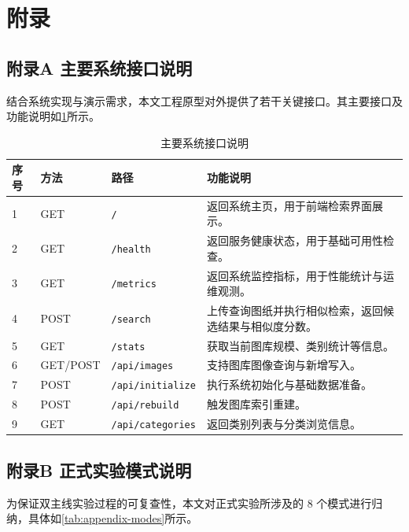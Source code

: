 \chapter*{附录}

\section*{附录A 主要系统接口说明}

结合系统实现与演示需求，本文工程原型对外提供了若干关键接口。其主要接口及功能说明如\cref{tab:appendix-api}所示。

\begin{table}[H]
  \centering
  \caption{主要系统接口说明}
  \label{tab:appendix-api}
  \small
  \setlength{\tabcolsep}{5pt}
  \begin{tabularx}{\textwidth}{lllX}
    \toprule
    序号 & 方法 & 路径 & 功能说明 \\
    \midrule
    1 & GET & \texttt{/} & 返回系统主页，用于前端检索界面展示。 \\
    2 & GET & \texttt{/health} & 返回服务健康状态，用于基础可用性检查。 \\
    3 & GET & \texttt{/metrics} & 返回系统监控指标，用于性能统计与运维观测。 \\
    4 & POST & \texttt{/search} & 上传查询图纸并执行相似检索，返回候选结果与相似度分数。 \\
    5 & GET & \texttt{/stats} & 获取当前图库规模、类别统计等信息。 \\
    6 & GET/POST & \texttt{/api/images} & 支持图库图像查询与新增写入。 \\
    7 & POST & \texttt{/api/initialize} & 执行系统初始化与基础数据准备。 \\
    8 & POST & \texttt{/api/rebuild} & 触发图库索引重建。 \\
    9 & GET & \texttt{/api/categories} & 返回类别列表与分类浏览信息。 \\
    \bottomrule
  \end{tabularx}
\end{table}

\section*{附录B 正式实验模式说明}

为保证双主线实验过程的可复查性，本文对正式实验所涉及的 8 个模式进行归纳，具体如\cref{tab:appendix-modes}所示。

